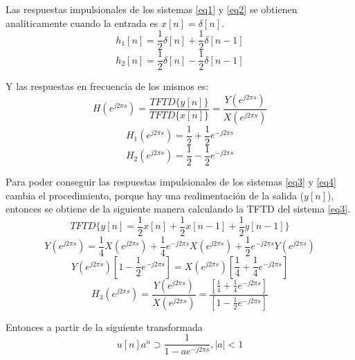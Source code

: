 \documentclass[letterpaper, 10 pt, conference]{ieeeconf}  %
\begin{document}
Las respuestas impulsionales de los sistemas \ref{eq1} y \ref{eq2} se obtienen anal\'iticamente cuando la entrada es $x[n] = \delta[n]$.
\begin{equation} \label{h1}
h_1[n] = \frac{1}{2}\delta[n] + \frac{1}{2}\delta[n-1]
\end{equation}
\begin{equation} \label{h2}
h_2[n] = \frac{1}{2}\delta[n] - \frac{1}{2}\delta[n-1]
\end{equation}

Y las respuestas en frecuencia de los mismos es:
\begin{equation*}
  H(e^{j2{\pi}s}) = \frac{TFTD\{y[n]\}}{TFTD\{x[n]\}} = \frac{Y(e^{j2{\pi}s})}{X(e^{j2{\pi}s})}
\end{equation*}
\begin{equation} \label{H1}
  H_1(e^{j2{\pi}s}) = \frac{1}{2} + \frac{1}{2}e^{-j2{\pi}s}
\end{equation}
\begin{equation} \label{H2}
  H_2(e^{j2{\pi}s}) = \frac{1}{2} - \frac{1}{2}e^{-j2{\pi}s}
\end{equation}

Para poder conseguir las respuestas impulsionales de los sistemas \ref{eq3} y \ref{eq4} cambia el procedimiento, porque hay una realimentaci\'on de la salida ($y[n]$), entonces se obtiene de la siguiente manera calculando la TFTD del sistema \ref{eq3}.
\[ TFTD\{y[n] = \frac{1}{2}x[n] + \frac{1}{2}x[n-1] + \frac{1}{2}y[n-1]\} \]
\begin{equation*}
  Y(e^{j2{\pi}s}) = \frac{1}{4}X(e^{j2{\pi}s}) + \frac{1}{4}e^{-j2{\pi}s}X(e^{j2{\pi}s}) + \frac{1}{2}e^{-j2{\pi}s}Y(e^{j2{\pi}s})
\end{equation*}
\begin{equation*}
  Y(e^{j2{\pi}s}) [ 1 - \frac{1}{2}e^{-j2{\pi}s}] = X(e^{j2{\pi}s}) [ \frac{1}{4} + \frac{1}{4}e^{-j2{\pi}s}]
\end{equation*}
\begin{equation} \label{H3}
  H_3(e^{j2{\pi}s}) = \frac{Y(e^{j2{\pi}s})}{X(e^{j2{\pi}s})} = \frac{[ \frac{1}{4} + \frac{1}{4}e^{-j2{\pi}s}]}{[ 1 - \frac{1}{2}e^{-j2{\pi}s}]}
\end{equation}

Entonces a partir de la siguiente transformada
\begin{equation*}
  u[n]a^n \supset \frac{1}{1-ae^{-j2{\pi}s}} , |a|<1
\end{equation*}
\end{document}
